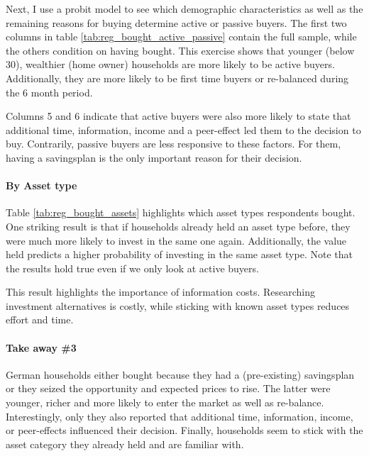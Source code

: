 \documentclass[ProjectABM]{subfiles}
\begin{document}

Next, I use a probit model to see which demographic characteristics as well as the remaining reasons for buying determine active or passive buyers. The first two columns in table \ref{tab:reg_bought_active_passive} contain the full sample, while the others condition on having bought. This exercise shows that younger (below 30), wealthier (home owner) households are more likely to be active buyers. Additionally, they are more likely to be first time buyers or re-balanced during the 6 month period.

Columns 5 and 6 indicate that active buyers were also more likely to state that additional time, information, income and a peer-effect led them to the decision to buy. Contrarily, passive buyers are less responsive to these factors. For them, having a savingsplan is the only important reason for their decision.





\paragraph{By Asset type}
Table \ref{tab:reg_bought_assets} highlights which asset types respondents bought. One striking result is that if households already held an asset type before, they were much more likely to invest in the same one again. Additionally, the value held predicts a higher probability of investing in the same asset type. Note that the results hold true even if we only look at active buyers.

This result highlights the importance of information costs. Researching investment alternatives is costly, while sticking with known asset types reduces effort and time.%



\paragraph{Take away \#3}
German households either bought because they had a (pre-existing) savingsplan or they seized the opportunity and expected prices to rise. The latter were younger, richer and more likely to enter the market as well as re-balance. Interestingly, only they also reported that additional time, information, income, or peer-effects influenced their decision. Finally, households seem to stick with the asset category they already held and are familiar with.
\end{document}
